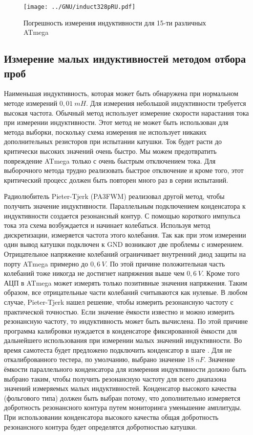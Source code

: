 \begin{figure}[H]
\centering
\texttt{[image: ../GNU/induct328pRU.pdf]}
\caption{Погрешность измерения индуктивности для 15-ти различных ATmega}
\label{fig:Induct328p}
\end{figure}

\subsection{Измерение малых индуктивностей методом отбора проб}
Наименьшая индуктивность, которая может быть обнаружена при нормальном методе измерений \(0,01~mH\).
Для измерения небольшой индуктивности требуется высокая частота.
Обычный метод использует измерение скорости нарастания тока при измерении индуктивности.
Этот метод не может быть использован для метода выборки, поскольку схема измерения не использует никаких дополнительных
резисторов при испытании катушки. Ток будет расти до критически высоких значений очень быстро.
Мы можем предотвратить повреждение ATmega только с очень быстрым отключением тока.
Для выборочного метода трудно реализовать быстрое отключение и кроме того, этот критический процесс должен быть
повторен много раз в серии испытаний.

Радиолюбитель Pieter-Tjerk (PA3FWM) реализовал другой метод, чтобы получить значение индуктивности.
Параллельным подключением конденсатора к индуктивности создается резонансный контур.
С помощью короткого импульса тока эта схема возбуждается и начинает колебаться.
Используя метод дискретизации, измеряется частота этого колебания.
Так как при этом измерении один вывод катушки подключен к GND возникают две проблемы с измерением.
Отрицательное напряжение колебаний ограничивает внутренний диод защиты на порту ATmega примерно до \(0,6~V\).
По этой причине положительная часть колебаний тоже никогда не достигнет напряжения выше чем \(0,6~V\).
Кроме того АЦП в ATmega может измерять только позитивные значения напряжения.
Таким образом, все отрицательные части колебаний считываются как нулевые.
В любом случае, Pieter-Tjerk нашел решение, чтобы измерить резонансную частоту с практической точностью.
Если значение ёмкости известно и можно измерить резонансную частоту, то индуктивность может быть вычислена.
По этой причине программа калибровки нуждается в конденсаторе фиксированной ёмкости для
дальнейшего использования при измерении малых значений индуктивности.
Во время самотеста будет предложено подключить конденсатор в шаге .
Для не откалиброванного тестера, по умолчанию, выбрано значение \(18~nF\).
Значение ёмкости параллельного конденсатора для измерения индуктивности должно быть выбрано
таким, чтобы получить резонансную частоту для всего диапазона значений измеряемых малых индуктивностей.
Конденсатор высокого качества (фольгового типа) должен быть выбран потому,
что дополнительно измеряется добротность резонансного контура путем мониторинга уменьшение амплитуды.
При использовании конденсатора высокого качества общая добротность резонансного контура будет 
определятся добротностью катушки.

